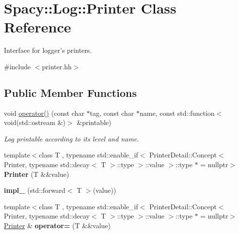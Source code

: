 \hypertarget{classSpacy_1_1Log_1_1Printer}{\section{\-Spacy\-:\-:\-Log\-:\-:\-Printer \-Class \-Reference}
\label{classSpacy_1_1Log_1_1Printer}
}


\-Interface for logger's printers.  




{\ttfamily \#include $<$printer.\-hh$>$}

\subsection*{\-Public \-Member \-Functions}
\begin{DoxyCompactItemize}
\item 
void \hyperlink{classSpacy_1_1Log_1_1Printer_a7cbc9a51fb4caf02a4fd46de907af6e9}{operator()} (const char $\ast$tag, const char $\ast$name, const std\-::function$<$ void(std\-::ostream \&)$>$ \&printable)
\begin{DoxyCompactList}\small\item\em \-Log printable according to its level and name. \end{DoxyCompactList}\item 
\hypertarget{classSpacy_1_1Log_1_1Printer_a808ff6fbaed9e16053d829b9ac72a052}{{\footnotesize template$<$class T , typename std\-::enable\-\_\-if$<$ Printer\-Detail\-::\-Concept$<$ Printer, typename std\-::decay$<$ T $>$\-::type $>$\-::value $>$\-::type $\ast$  = nullptr$>$ }\\{\bfseries \-Printer} (\-T \&\&value)}\label{classSpacy_1_1Log_1_1Printer_a808ff6fbaed9e16053d829b9ac72a052}

\item 
\hypertarget{classSpacy_1_1Log_1_1Printer_a2686673d32928c40bcd9db83e31a45d5}{{\bfseries impl\-\_\-} (std\-::forward$<$ \-T $>$(value))}\label{classSpacy_1_1Log_1_1Printer_a2686673d32928c40bcd9db83e31a45d5}

\item 
\hypertarget{classSpacy_1_1Log_1_1Printer_ae357ead97367f658a1debecbd541e53f}{{\footnotesize template$<$class T , typename std\-::enable\-\_\-if$<$ Printer\-Detail\-::\-Concept$<$ Printer, typename std\-::decay$<$ T $>$\-::type $>$\-::value $>$\-::type $\ast$  = nullptr$>$ }\\\hyperlink{classSpacy_1_1Log_1_1Printer}{\-Printer} \& {\bfseries operator=} (\-T \&\&value)}\label{classSpacy_1_1Log_1_1Printer_ae357ead97367f658a1debecbd541e53f}


\end{DoxyCompactItemize}
